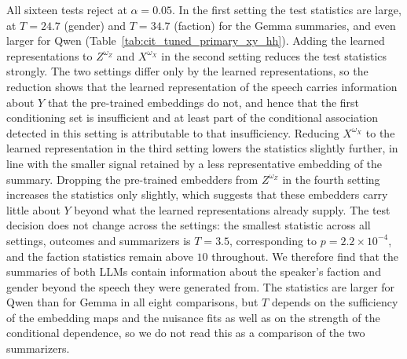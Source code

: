 \documentclass[twoside,11pt]{article}
\begin{document}
All sixteen tests reject at $\alpha = 0.05$.
In the first setting the test statistics are large, at $T = 24.7$ (gender) and $T = 34.7$ (faction) for the Gemma summaries, and even larger for Qwen (Table~\ref{tab:cit_tuned_primary_xy_hh}).
Adding the learned representations to $Z^{\omega_Z}$ and $X^{\omega_X}$ in the second setting reduces the test statistics strongly. The two settings differ only by the learned representations, so the reduction shows that the learned representation of the speech carries information about $Y$ that the pre-trained embeddings do not, and hence that the first conditioning set is insufficient and at least part of the conditional association detected in this setting is attributable to that insufficiency.
Reducing $X^{\omega_X}$ to the learned representation in the third setting lowers the statistics slightly further, in line with the smaller signal retained by a less representative embedding of the summary.
Dropping the pre-trained embedders from $Z^{\omega_Z}$ in the fourth setting increases the statistics only slightly, which suggests that these embedders carry little about $Y$ beyond what the learned representations already supply.
The test decision does not change across the settings: the smallest statistic across all settings, outcomes and summarizers is $T = 3.5$, corresponding to $p = 2.2 \times 10^{-4}$, and the faction statistics remain above $10$ throughout.
We therefore find that the summaries of both LLMs contain information about the speaker's faction and gender beyond the speech they were generated from.
The statistics are larger for Qwen than for Gemma in all eight comparisons, but $T$ depends on the sufficiency of the embedding maps and the nuisance fits as well as on the strength of the conditional dependence, so we do not read this as a comparison of the two summarizers.
\end{document}
